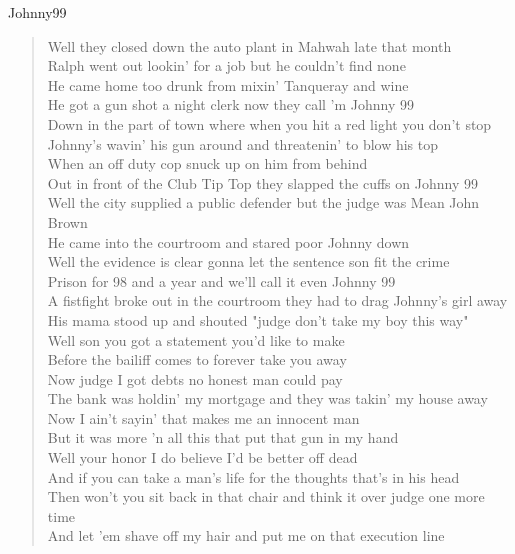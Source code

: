 Johnny99
\begin{verse}
Well they closed down the auto plant in Mahwah late that month\\
Ralph went out lookin' for a job but he couldn't find none\\ 
He came home too drunk from mixin' 
Tanqueray and wine\\
He got a gun shot a night clerk now they call 'm Johnny 99\\

Down in the part of town where when you hit a red light you don't stop \\
Johnny's wavin' his gun around and threatenin' to blow his top\\
When an off duty cop snuck up on him from behind \\
Out in front of the Club Tip Top they slapped the cuffs on Johnny 99\\

Well the city supplied a public defender but the judge was Mean John Brown \\
He came into the courtroom and stared poor Johnny down \\
Well the evidence is clear gonna let the sentence son fit the crime \\
Prison for 98 and a year and we'll call it even Johnny 99 \\

A fistfight broke out in the courtroom they had to drag Johnny's girl away \\
His mama stood up and shouted "judge don't take my boy this way" \\
Well son you got a statement you'd like to make \\
Before the bailiff comes to forever take you away \\

Now judge I got debts no honest man could pay \\
The bank was holdin' my mortgage and they was takin' my house away \\
Now I ain't sayin' that makes me an innocent man \\
But it was more 'n all this that put that gun in my hand \\

Well your honor I do believe I'd be better off dead \\
And if you can take a man's life for the thoughts that's in his head \\
Then won't you sit back in that chair and think it over judge one more time \\
And let 'em shave off my hair and put me on that execution line\\
\end{verse}